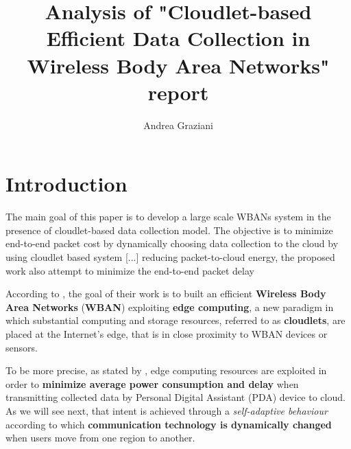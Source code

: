 \documentclass[sigchi]{acmart}
\begin{document}
\title{Analysis of "Cloudlet-based Efficient Data Collection in Wireless Body Area Networks" report}

\author{Andrea Graziani}

\renewcommand{\shortauthors}{Andrea Graziani (0273395)}

\maketitle

\section{Introduction}

\vspace{0.3cm}

\begin{quoting}[font=itshape, begintext={``}, endtext={''\cite[par.~1.4]{MSAReport}}]
The main goal of this paper is to develop a large scale WBANs system in the presence of cloudlet-based data collection model. The objective is to minimize end-to-end packet cost by dynamically choosing data collection to the cloud by using cloudlet based system [...] reducing packet-to-cloud energy, the proposed work also attempt to minimize the end-to-end packet delay
\end{quoting}

\vspace{0.3cm}

According to \citet{MSAReport}, the goal of their work is to built an efficient \textbf{Wireless Body Area Networks} (\textbf{WBAN}) exploiting \textbf{edge computing}, a new paradigm in which substantial computing and storage resources, referred to as \textbf{cloudlets}, are placed at the Internet's edge, that is in close proximity to WBAN devices or sensors.\cite{TheEmergenceOfEdgeComputing}

To be more precise, as stated by \citet{MSAReport}, edge computing resources are exploited in order to \textbf{minimize average power consumption and delay} when transmitting collected data by Personal Digital Assistant (PDA) device to cloud. As we will see next, that intent is achieved through a \textit{self-adaptive behaviour} according to which \textbf{communication technology is dynamically changed} when users move from one region to another. 
\end{document}
